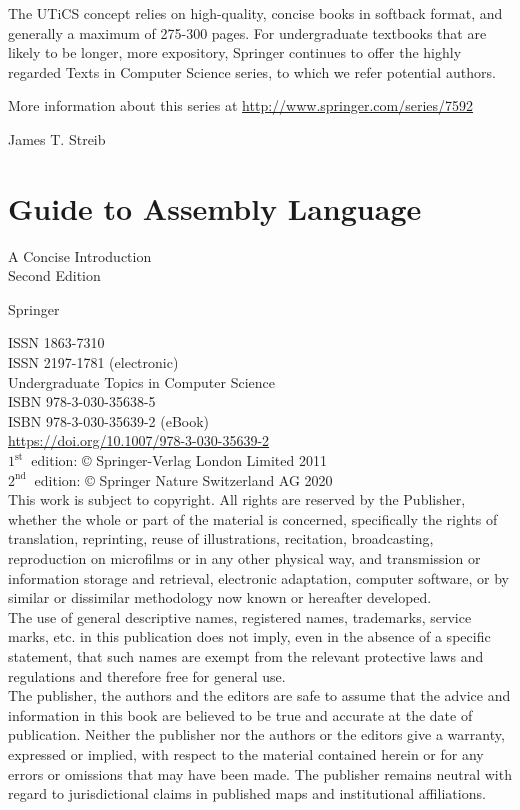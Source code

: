 \documentclass[10pt]{book}
\begin{document}
The UTiCS concept relies on high-quality, concise books in softback format, and generally a maximum of 275-300 pages. For undergraduate textbooks that are likely to be longer, more expository, Springer continues to offer the highly regarded Texts in Computer Science series, to which we refer potential authors.

More information about this series at \href{http://www.springer.com/series/7592}{http://www.springer.com/series/7592}


James T. Streib

\section{Guide to Assembly Language }
A Concise Introduction\\
Second Edition

Springer

ISSN 1863-7310\\
ISSN 2197-1781 (electronic)\\
Undergraduate Topics in Computer Science\\
ISBN 978-3-030-35638-5\\
ISBN 978-3-030-35639-2 (eBook)\\
\href{https://doi.org/10.1007/978-3-030-35639-2}{https://doi.org/10.1007/978-3-030-35639-2}\\
$1^{\text {st }}$ edition: © Springer-Verlag London Limited 2011\\
$2^{\text {nd }}$ edition: © Springer Nature Switzerland AG 2020\\
This work is subject to copyright. All rights are reserved by the Publisher, whether the whole or part of the material is concerned, specifically the rights of translation, reprinting, reuse of illustrations, recitation, broadcasting, reproduction on microfilms or in any other physical way, and transmission or information storage and retrieval, electronic adaptation, computer software, or by similar or dissimilar methodology now known or hereafter developed.\\
The use of general descriptive names, registered names, trademarks, service marks, etc. in this publication does not imply, even in the absence of a specific statement, that such names are exempt from the relevant protective laws and regulations and therefore free for general use.\\
The publisher, the authors and the editors are safe to assume that the advice and information in this book are believed to be true and accurate at the date of publication. Neither the publisher nor the authors or the editors give a warranty, expressed or implied, with respect to the material contained herein or for any errors or omissions that may have been made. The publisher remains neutral with regard to jurisdictional claims in published maps and institutional affiliations.
\end{document}
